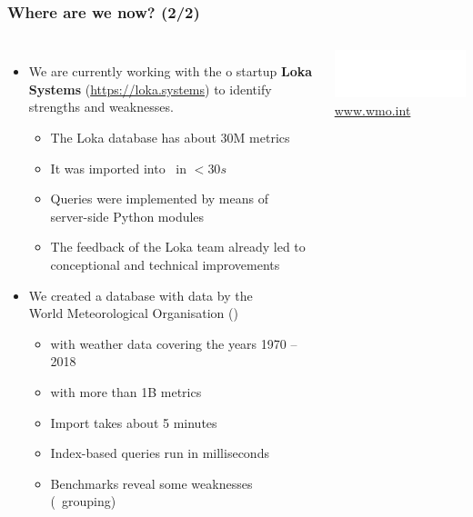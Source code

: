 \documentclass[mathserif,usenames,dvipsnames]{beamer}
\begin{document}
\begin{frame}[shrink]
\frametitle{Where are we now? (2/2)}
\begin{columns}[T]
\begin{itemize}
\item We are currently working with the o
      startup \textbf{Loka Systems} (\url{https://loka.systems})
      to identify strengths and weaknesses.
      \begin{itemize}
      \item The Loka database has about 30M metrics
      \item It was imported into \nowdb\ in $< 30s$
      \item Queries were implemented by means of\\
            server-side Python modules
      \item The feedback of the Loka team already led
            to conceptional and technical improvements
      \end{itemize}
\item We created a database with data by the\\
      World Meteorological Organisation
      ()
      \begin{itemize}
      \item with weather data covering the years 1970 -- 2018
      \item with more than 1B metrics
      \item Import takes about 5 minutes
      \item Index-based queries run in milliseconds
      \item Benchmarks reveal some weaknesses \\
            (\eg\ grouping)
      \end{itemize}
\end{itemize}
\begin{center}
\linewidth
\includegraphics[width=0.85\linewidth]{lokalogo.png}
\vskip0.85cm
\linewidth
\vskip1.0cm
\linewidth
{\color{MidnightBlue} \url{www.wmo.int}}
\end{center}
\end{columns}
\end{frame}
\end{document}
